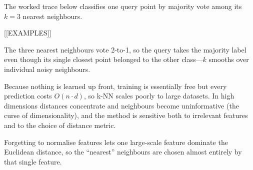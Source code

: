 The worked trace below classifies one query point by majority vote among its $k=3$ nearest neighbours.

[[EXAMPLES]]

The three nearest neighbours vote 2-to-1, so the query takes the majority label even though its single closest point belonged to the other class---$k$ smooths over individual noisy neighbours.

Because nothing is learned up front, training is essentially free but every prediction costs $O(n \cdot d)$, so k-NN scales poorly to large datasets. In high dimensions distances concentrate and neighbours become uninformative (the curse of dimensionality), and the method is sensitive both to irrelevant features and to the choice of distance metric.

\begin{trapbox}
Forgetting to normalise features lets one large-scale feature dominate the Euclidean distance, so the ``nearest'' neighbours are chosen almost entirely by that single feature.
\end{trapbox}
